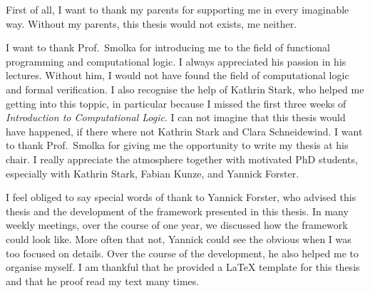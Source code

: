 First of all, I want to thank my parents for supporting me in every imaginable way.  Without my parents, this thesis would not exists, me neither.

I want to thank Prof.~Smolka for introducing me to the field of functional programming and computational logic.  I always appreciated his passion in
his lectures.  Without him, I would not have found the field of computational logic and formal verification.  I also recognise the help of Kathrin
Stark, who helped me getting into this toppic, in particular because I missed the first three weeks of \textit{Introduction to Computational Logic}.
I can not imagine that this thesis would have happened, if there where not Kathrin Stark and Clara Schneidewind.  I want to thank Prof.~Smolka for
giving me the opportunity to write my thesis at his chair.  I really appreciate the atmosphere together with motivated PhD students, especially with
Kathrin Stark, Fabian Kunze, and Yannick Forster.

I feel obliged to say special words of thank to Yannick Forster, who advised this thesis and the development of the framework presented in this
thesis.  In many weekly meetings, over the course of one year, we discussed how the framework could look like.  More often that not, Yannick could see
the obvious when I was too focused on details.  Over the course of the development, he also helped me to organise myself.  I am thankful that he
provided a {\LaTeX} template for this thesis and that he proof read my text many times.


